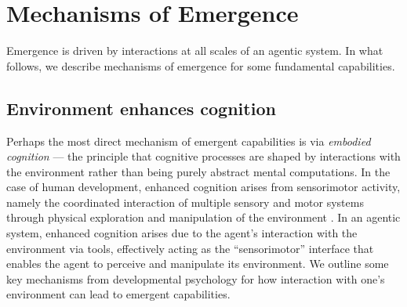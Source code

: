 \documentclass{article}
\theoremstyle{plain}
\theoremstyle{definition}
\theoremstyle{remark}
\begin{document}


\section{Mechanisms of Emergence}
\label{sec:emergence}


Emergence is driven by interactions at all scales of an agentic system. In what follows, we describe mechanisms of emergence for some fundamental capabilities.


\subsection{Environment enhances cognition} 
\label{ssec:cognition}

Perhaps the most direct mechanism of emergent capabilities is via \emph{embodied cognition} \cite{merleau1945phenomenology,varela1991embodied,barsalou1999perceptual} --- the principle that cognitive processes are shaped by interactions with the environment rather than being purely abstract mental computations. In the case of human development, enhanced cognition arises from sensorimotor activity, namely the coordinated interaction of multiple sensory and motor systems through physical exploration and manipulation of the environment \cite{ballard1997deictic,smith2005development}. In an agentic system, enhanced cognition arises due to the agent's interaction with the environment via tools, effectively acting as the ``sensorimotor'' interface that enables the agent to perceive and manipulate its environment. We outline some key mechanisms from developmental psychology for how interaction with one's environment can lead to emergent capabilities.
\end{document}
